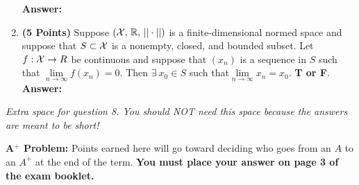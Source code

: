 \documentclass[letterpaper]{article}
\newcommand{\real}{\mathbb R}  %
\newcommand{\ds}{\displaystyle}
\begin{document}
\begin{enumerate}
    \textbf{Answer:}

        \vspace*{4cm}

    \item \textbf{(5 Points)} Suppose $({\cal X},\,\real,\, || \cdot||)$ is a finite-dimensional normed space and suppose that $S\subset{\cal X}$ is a nonempty, closed, and bounded subset. Let $f: {\cal X} \to R$ be continuous and suppose that $(x_n)$ is a sequence in $S$ such that $\lim\limits_{n\to \infty} f(x_n) =0$.  Then  $\exists~x_0\in S$ such that$\lim\limits_{n\to \infty} x_n = x_0$. \textbf{ T or F}.\\

    \textbf{Answer:}






%
%



%



\end{enumerate}

\newpage
\textit{Extra space for question 8. You should NOT need this space because the answers are meant to be short!   }

\newpage


  \textbf{A$^+$ Problem: } Points earned here will go toward deciding who goes from an $A$ to an $A^+$ at the end of the term. \textbf{You must place your answer on page 3 of the exam booklet.}\\
\end{document}

